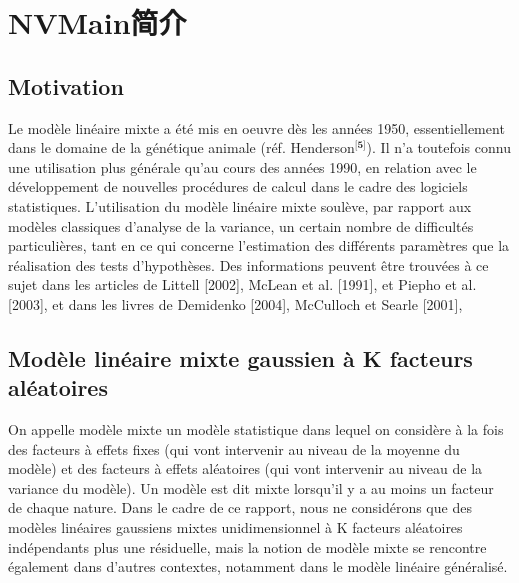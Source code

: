 \documentclass[11pt,fleqn]{book} %
\begin{document}
\renewcommand\contentsname{目录}
\renewcommand{\bibname}{Bibliographie}
\tableofcontents%


\pagestyle{fancy} %



\chapter{NVMain简介}

\section{Motivation}

  \vspace{1em}

 Le modèle linéaire mixte a été mis en oeuvre dès les années 1950, essentiellement dans
le domaine de la génétique animale (réf.       Henderson$^{\textbf{[5]}}$). Il n’a toutefois
connu une utilisation plus générale qu’au cours des années 1990, en relation avec le
développement de nouvelles procédures de calcul dans le cadre des logiciels statistiques. L’utilisation du modèle linéaire mixte soulève, par rapport aux modèles classiques d’analyse de la variance, un certain nombre de difficultés particulières, tant en ce qui concerne l’estimation des différents paramètres que la réalisation des tests d’hypothèses. Des informations peuvent être trouvées à ce sujet
dans les articles de Littell [2002], McLean et al. [1991], et Piepho et al. [2003], et dans les
livres de Demidenko [2004], McCulloch et Searle [2001], 

  \vspace{2em}

\section{Modèle linéaire mixte gaussien à K facteurs aléatoires}

  \vspace{1em}
  
  On appelle modèle mixte un modèle statistique dans lequel on considère à la fois des facteurs à effets fixes (qui vont intervenir au niveau de la moyenne du modèle) et des facteurs à effets aléatoires (qui vont intervenir au niveau de la variance du modèle). Un modèle est dit mixte lorsqu’il y a au moins un facteur de chaque nature. Dans le cadre de ce rapport, nous ne considérons
que des modèles linéaires gaussiens mixtes unidimensionnel à K facteurs aléatoires indépendants plus une résiduelle, mais la notion de modèle mixte se rencontre également dans d’autres contextes, notamment dans le modèle linéaire généralisé.
\end{document}
